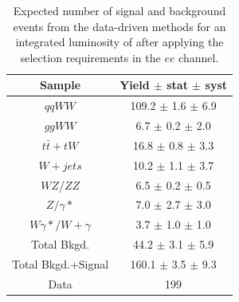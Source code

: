 \begin{table}[ht!]
  \begin{center}
  \begin{tabular} {|c|c|}
\hline
Sample                & Yield $\pm$ stat $\pm$ syst \\ \hline \hline
$qqWW$                & 109.2 $\pm$  1.6 $\pm$  6.9  \\ \hline
$ggWW$                &  6.7 $\pm$  0.2 $\pm$  2.0  \\ \hline
$t\bar{t} + tW$      & 16.8 $\pm$  0.8 $\pm$  3.3  \\ \hline
$W+jets$              & 10.2 $\pm$  1.1 $\pm$  3.7  \\ \hline
$WZ$/$ZZ$             &  6.5 $\pm$  0.2 $\pm$  0.5  \\ \hline
$Z/\gamma*$          &  7.0 $\pm$  2.7 $\pm$  3.0  \\ \hline
$W\gamma*/W+\gamma$ &  3.7 $\pm$  1.0 $\pm$  1.0  \\ \hline \hline
Total Bkgd.           & 44.2 $\pm$  3.1 $\pm$  5.9  \\ \hline \hline
Total Bkgd.+Signal    & 160.1 $\pm$  3.5 $\pm$  9.3  \\ \hline \hline
Data                  & 199 \\ \hline
\end{tabular}
  \caption{Expected number of signal and background events from the data-driven methods for
  an integrated luminosity of \intlumi after applying the selection requirements in the $ee$ channel.}
   \label{tab:data_yields_ee}
  \end{center}
\end{table}

